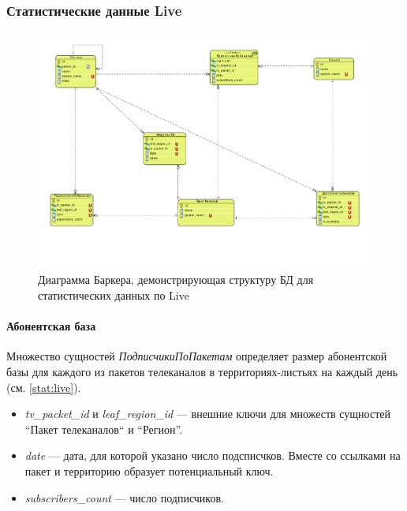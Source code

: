 \subsubsection{Статистические данные Live}
\begin{figure}[!ht]
\begin{center}
\vspace{-0.5cm}
\includegraphics[scale=0.65, trim=10mm 30mm 0mm 10mm, clip]{../resources/uml/TV_STAT.pdf}
\caption{Диаграмма Баркера, демонстрирующая структуру БД для статистических данных по Live}
\label{gr:tv_deduct}
\end{center} 
\end{figure}

\paragraph{Абонентская база} Множество сущностей \textit{ПодписчикиПоПакетам} определяет размер
абонентской базы для каждого из пакетов телеканалов в территориях-листьях на каждый день (см. \ref{stat:live}).
\begin{itemize}
\item{
  \textit{tv\_packet\_id} и \textit{leaf\_region\_id} --- внешние ключи для множеств сущностей ``Пакет телеканалов`` и
  ``Регион''.
}
\item{
  \textit{date} --- дата, для которой указано число подсписчков. Вместе со ссылками на пакет и территорию
образует потенциальный ключ.
}
\item{
  \textit{subscribers\_count} --- число подписчиков. 
}
\end{itemize}

